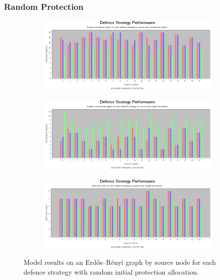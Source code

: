 \documentclass[results.tex]{subfiles}
\begin{document}
\newpage 


\subsubsection{Random Protection}



\newpage

\begin{figure}[!ht]
\centering
     \begin{subfigure}[b]{0.9\textwidth}
         \centering
         \includegraphics[width=\textwidth]{ErdosRenyi/Random/RandomInfectedChart}
         \label{fig:er-ran-infected}
     \end{subfigure}
     \vfill
     \begin{subfigure}[b]{0.9\textwidth}
         \centering
         \includegraphics[width=\textwidth]{ErdosRenyi/Random/RandomProtectedChart}
         \label{fig:er-ran-protected}
     \end{subfigure}
     \vfill
     \begin{subfigure}[b]{0.9\textwidth}
         \centering
         \includegraphics[width=\textwidth]{ErdosRenyi/Random/RandomEndTurnChart}
         \label{fig:er-ran-end}
     \end{subfigure}
        \caption{Model results on an Erdős–Rényi graph by source node for each defence strategy with random initial protection allocation.}
        \label{fig:er-ran-charts}
\end{figure}
\end{document}
